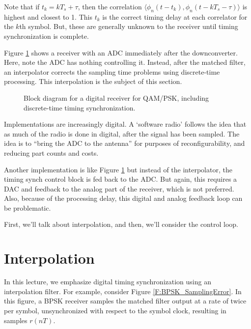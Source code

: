 Note that if $t_k = kT_{s} + \tau$, then the correlation $\langle
\phi_n(t-t_k), \phi_n(t - kT_{s} -  \tau) \rangle$ is highest and
closest to 1. This $t_k$ is the correct timing delay at each
correlator for the $k$th symbol. But, these are generally unknown to
the receiver until timing synchronization is complete.

Figure \ref{F:DigitalReceiver} shows a receiver with an ADC
immediately after the downconverter.  Here, note the ADC has nothing
controlling it.  Instead, after the matched filter, an interpolator
corrects the sampling time problems using discrete-time processing.
This interpolation is the subject of this section.

\begin{figure}[htbp]
  \centerline{}
  \caption{Block diagram for a digital receiver for QAM/PSK, including discrete-time timing synchronization.}
  \label{F:DigitalReceiver}
\end{figure}

Implementations are increasingly digital.
A `software radio' follows the idea that as much of the radio is
done in digital, after the signal has been sampled. The idea is to
``bring the ADC to the antenna'' for purposes of reconfigurability,
and reducing part counts and costs.

Another implementation is like Figure \ref{F:DigitalReceiver} but
instead of the interpolator, the timing synch control block is fed
back to the ADC.  But again, this requires a DAC and feedback to the
analog part of the receiver, which is not preferred.  Also, because
of the processing delay, this digital and analog feedback loop can
be problematic.

First, we'll talk about interpolation, and then, we'll consider the
control loop.

\section{Interpolation}

In this lecture, we  emphasize digital timing synchronization
using an interpolation filter.  For example, consider Figure
\ref{F:BPSK_SamplingError}.  In this figure, a BPSK receiver samples
the matched filter output at a rate of twice per symbol,
unsynchronized with respect to the symbol clock, resulting in samples
$r(nT_{})$.

